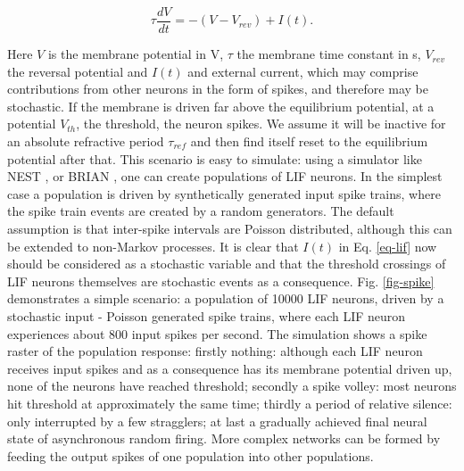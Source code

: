 \documentclass[10pt]{article}
\begin{document}
{\begin{equation}
\tau \frac{dV}{dt} = -(V - V_{rev}) + I(t).
\label{eq-lif}
\end{equation}

Here $V$ is the membrane potential in V, $\tau$ the membrane time constant in s, $V_{rev}$ the reversal potential and $I(t)$ and external current, which may comprise contributions from other neurons in the form of spikes, and therefore may be stochastic.
If the membrane is driven far above the equilibrium potential, at a potential $V_{th}$, the threshold, the neuron spikes.
We assume it will be inactive for an absolute refractive period $\tau_{ref}$ and then find itself reset to the equilibrium potential after that.  
This scenario is easy to simulate: using a simulator like NEST \cite{nest}, or BRIAN \cite{brian}, one can create populations of LIF neurons.
In the simplest case a population is driven by synthetically generated input spike trains, where the spike train events are created by a random generators.
The default assumption is that inter-spike intervals are Poisson distributed, although this can be extended to non-Markov processes.
It is clear that $I(t)$ in Eq. \ref{eq-lif} now should be considered as a stochastic variable and that the threshold crossings of LIF neurons themselves are stochastic events as a consequence.
Fig. \ref{fig-spike}  demonstrates a simple scenario: a population of 10000 LIF neurons, driven by a stochastic input - Poisson generated spike trains, where each LIF neuron experiences about 800 input spikes per second.
The simulation shows a spike raster of the population response:
firstly nothing: although each LIF neuron receives input spikes and as a consequence has its membrane potential driven up, none of the neurons have reached threshold;
secondly a spike volley: most neurons hit threshold at approximately the same time;
thirdly a period of relative silence: only interrupted by a few stragglers;
at last a gradually achieved final neural state of asynchronous random firing.
More complex networks can be formed by feeding the output spikes of one population into other populations.

}
\end{document}
